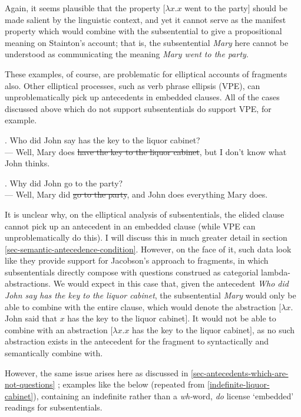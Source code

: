 \documentclass[doublespace]{umthesis}
\begin{document}
Again, it seems plausible that the property $[\lambda x. x $ went to the party$]$ should be made salient by the linguistic context, and yet it cannot serve as the manifest property which would combine with the subsentential to give a propositional meaning on Stainton's account; that is, the subsentential {\it Mary} here cannot be understood as communicating the meaning {\it Mary went to the party}.

These examples, of course, are problematic for elliptical accounts of fragments also. Other elliptical processes, such as verb phrase ellipsis (VPE), can unproblematically pick up antecedents in embedded clauses. All of the cases discussed above which do not support subsententials do support VPE, for example.

\ex. 	Who did John say has the key to the liquor cabinet?\\
	--- Well, Mary does \sout{have the key to the liquor cabinet}, but I don't know what John thinks.

\ex. 	Why did John go to the party?\\
	--- Well, Mary did \sout{go to the party}, and John does everything Mary does.

 It is unclear why, on the elliptical analysis of subsententials, the elided clause cannot pick up an antecedent in an embedded clause (while VPE can unproblematically do this). I will discuss this in much greater detail in section \ref{sec-semantic-antecedence-condition}. However, on the face of it, such data look like they provide support for Jacobson's approach to fragments, in which subsententials directly compose with questions construed as categorial lambda-abstractions. We would expect in this case that, given the antecedent {\it Who did John say has the key to the liquor cabinet}, the subsentential {\it Mary} would only be able to combine with the entire clause, which would denote the abstraction $[\lambda x. $ John said that $ x $ has the key to the liquor cabinet$]$. It would not be able to combine with an abstraction $[\lambda x. x$ has the key to the liquor cabinet$]$, as no such abstraction exists in the antecedent for the fragment to syntactically and semantically combine with.
 
 However, the same issue arises here as discussed in \ref{sec-antecedents-which-are-not-questions} ; examples like the below (repeated from \ref{indefinite-liquor-cabinet}), containing an indefinite rather than a {\it wh-}word, \emph{do} license `embedded' readings for subsententials.
 
\end{document}
